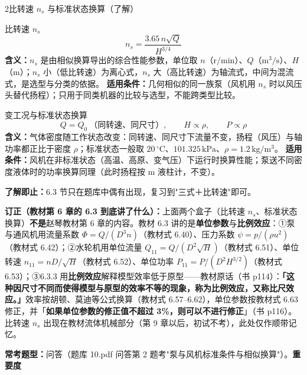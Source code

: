 \begin{kaodian}{2}{比转速 $n_s$ 与标准状态换算（了解）}
\begin{gongshi}{比转速 $n_s$}
\[ n_s=\frac{3.65\,n\sqrt{Q}}{H^{3/4}} \]
\textbf{含义：}$n_s$ 是由相似换算导出的综合性能参数，单位取 $n$（$\mathrm{r/min}$）、$Q$（$\mathrm{m^{3}/s}$）、$H$（$\mathrm{m}$）；$n_s$ 小（低比转速）为离心式，$n_s$ 大（高比转速）为轴流式，中间为混流式，是选型与分类的依据。
\textbf{适用条件：}几何相似的同一族泵（风机用 $n_s$ 时以风压头替代扬程）；只用于同类机器的比较与选型，不能跨类型比较。
\end{gongshi}

\begin{gongshi}{变工况与标准状态换算}
\[ Q=Q_0\ \text{（同转速、同尺寸）},\qquad H\propto\rho,\qquad P\propto\rho \]
\textbf{含义：}气体密度随工作状态改变：同转速、同尺寸下流量不变，扬程（风压）与轴功率都正比于密度 $\rho$；标准状态一般取 $20\,^\circ\mathrm{C}$、$101.325\,\mathrm{kPa}$、$\rho=1.2\,\mathrm{kg/m^{3}}$。
\textbf{适用条件：}风机在非标准状态（高温、高原、变气压）下运行时换算性能；泵送不同密度液体时的功率换算同理（此时扬程按 $\mathrm{m}$ 液柱计，不变）。
\end{gongshi}

\begin{tishi}
\textbf{了解即止：}6.3 节只在题库中偶有出现，复习到"三式＋比转速"即可。

\textbf{订正（教材第 6 章的 6.3 到底讲了什么）：}上面两个盒子（比转速 $n_s$、标准状态换算）\textbf{不是}赵琴教材第 6 章的内容。教材 6.3 讲的是\textbf{单位参数}与\textbf{比例效应}：①泵与通风机用流量系数 $\Phi=Q/(D^{3}n)$（教材式 6.40）、压力系数 $\psi=p/(\rho u^{2})$（教材式 6.42）；②水轮机用单位流量 $Q_{11}=Q/(D^{2}\sqrt{H})$（教材式 6.51）、单位转速 $n_{11}=nD/\sqrt{H}$（教材式 6.52）、单位功率 $P_{11}=P/(D^{2}H^{3/2})$（教材式 6.53）；③6.3.3 用\textbf{比例效应}解释模型效率低于原型——教材原话（书 p114）：\textbf{「这种因尺寸不同而使得模型与原型的效率不等的现象，称为比例效应，又称比尺效应。」}效率按胡顿、莫迪等公式换算（教材式 6.57--6.62），单位参数按教材式 6.63 修正，并「\textbf{如果单位参数的修正值不超过 3\%，则可以不进行修正}」（书 p116）。比转速 $n_s$ 出现在教材流体机械部分（第 9 章以后，初试不考），此处仅作顺带记忆。
\end{tishi}

\textbf{常考题型：}问答（题库 10.pdf 问答第 2 题考"泵与风机标准条件与相似换算"）。\quad\textbf{重要度 }\quad{}\quad{}
\end{kaodian}

